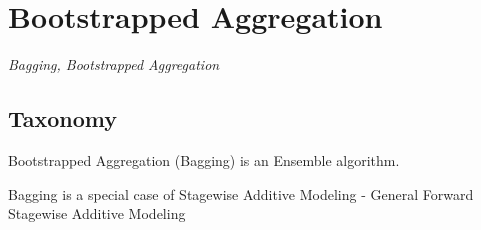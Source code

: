 

\section{Bootstrapped Aggregation} 
\label{sec:bagging}

\emph{Bagging, Bootstrapped Aggregation}

\subsection{Taxonomy}
Bootstrapped Aggregation (Bagging) is an Ensemble algorithm.

Bagging is a special case of Stagewise Additive Modeling - General Forward Stagewise Additive Modeling


